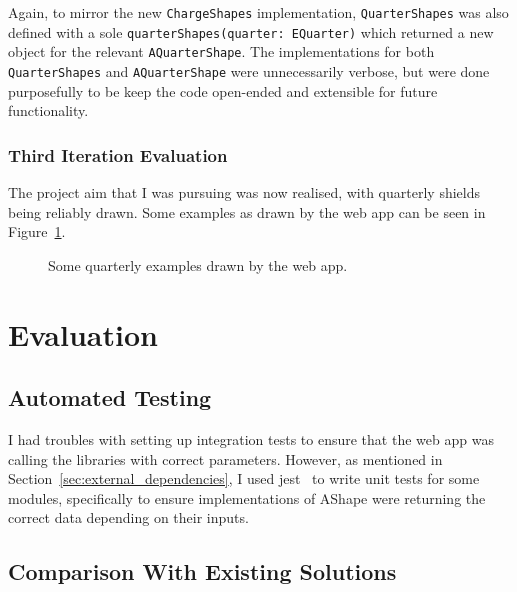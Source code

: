 \documentclass[nobib, a4paper, twoside, justified]{tufte-book}
\begin{document}
Again, to mirror the new \texttt{ChargeShapes} implementation, \texttt{QuarterShapes} was also
defined with a sole \texttt{quarterShapes(quarter: EQuarter)} which returned a new object for the
relevant \texttt{AQuarterShape}. The implementations for both \texttt{QuarterShapes} and
\texttt{AQuarterShape} were unnecessarily verbose, but were done purposefully to be keep the code
open-ended and extensible for future functionality.

\subsection{Third Iteration Evaluation}%
\label{sub:third_iteration_evaluation}

The project aim that I was pursuing was now realised, with quarterly shields being reliably drawn.
Some examples as drawn by the web app can be seen in Figure~\ref{fig:quarterly_shields}.

\begin{figure}[h]
  \qquad
  \caption{Some quarterly examples drawn by the web app.}%
  \label{fig:quarterly_shields}
\end{figure}

\chapter{Evaluation}%
\label{cha:evaluation}

\section{Automated Testing}%
\label{sec:automated_testing}

I had troubles with setting up integration tests to ensure that the web app was calling the
libraries with correct parameters. However, as mentioned in
Section~\ref{sec:external_dependencies}, I used jest~\autocite{jest} to write unit tests for some
modules, specifically to ensure implementations of AShape were returning the correct data depending
on their inputs.

\section{Comparison With Existing Solutions}%
\label{sec:comparison_with_existing_solutions}
\end{document}
